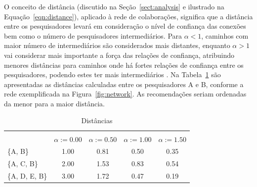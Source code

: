 \documentclass[12pt]{article}
\begin{document}
O conceito de distância (discutido na Seção~\ref{sect:analysis} e ilustrado na Equação~\ref{eqn:distance}), aplicado à rede de colaborações, significa que a distância entre os pesquisadores levará em consideração o nível de confiança das conexões bem como o número de pesquisadores intermediários. Para $\alpha < 1$, caminhos com maior número de intermediários são considerados mais distantes, enquanto $\alpha > 1$ vai considerar mais importante a força das relações de confiança, atribuindo menores distâncias para caminhos onde há fortes relações de confiança entre os pesquisadores, podendo estes ter mais intermediários \cite{opsahl2010node}. Na Tabela~\ref{tab:distances} são apresentadas as distâncias calculadas entre os pesquisadores A e B, conforme a rede exemplificada na Figura~\ref{fig:network}. As recomendações seriam ordenadas da menor para a maior distância.

{\tiny
  \begin{table}[ht]
    \caption{Distâncias}
    \label{tab:distances}
    \centering
    \begin{tabular}{|lcccc|}
      \hline
      \rowcolor[HTML]{343434} 
      \multicolumn{1}{|c}{\cellcolor[HTML]{343434}{\color[HTML]{FFFFFF} }}                       & \multicolumn{4}{c|}{\cellcolor[HTML]{343434}{\color[HTML]{FFFFFF} $ d^{w\alpha}(i, j) $}}                                               \\
      \rowcolor[HTML]{656565} 
      \multicolumn{1}{|c}{\multirow{-2}{*}{\cellcolor[HTML]{343434}{\color[HTML]{FFFFFF} Caminho}}} & {\color[HTML]{EFEFEF} $ \alpha := 0.00 $} & {\color[HTML]{EFEFEF} $ \alpha := 0.50 $} & {\color[HTML]{EFEFEF} $ \alpha := 1.00 $} & {\color[HTML]{EFEFEF} $ \alpha := 1.50 $} \\ \cline{1-1}
      \multicolumn{1}{|l|}{\{A, B\}}                                                             & 1.00                        & 0.81                        & 0.50                        & 0.35                        \\
      \multicolumn{1}{|l|}{\{A, C, B\}}                                                          & 2.00                        & 1.53                        & 0.83                        & 0.54                        \\
      \multicolumn{1}{|l|}{\{A, D, E, B\}}                                                       & 3.00                        & 1.72                        & 0.47                        & 0.19                        \\ \hline
    \end{tabular}
  \end{table}  
  }
\end{document}
